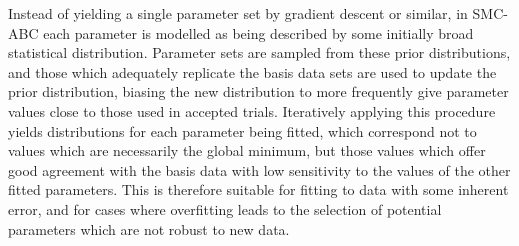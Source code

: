 Instead of yielding a single parameter set by gradient descent or similar, in SMC-ABC each parameter is modelled as being described by some initially broad statistical distribution.
Parameter sets are sampled from these prior distributions, and those which adequately replicate the basis data sets are used to update the prior distribution, biasing the new distribution to more frequently give parameter values close to those used in accepted trials.
Iteratively applying this procedure yields distributions for each parameter being fitted, which correspond not to values which are necessarily the global minimum, but those values which offer good agreement with the basis data with low sensitivity to the values of the other fitted parameters.
This is therefore suitable for fitting to data with some inherent error, and for cases where overfitting leads to the selection of potential parameters which are not robust to new data.
